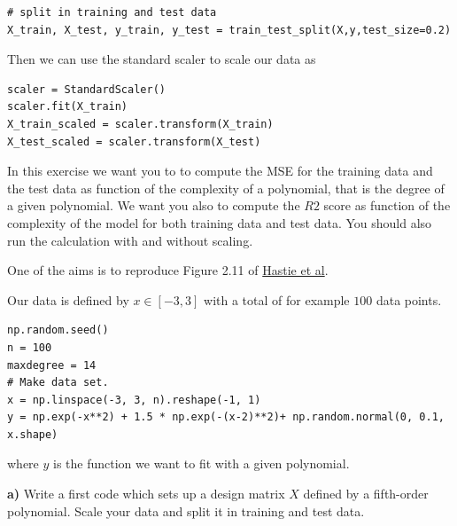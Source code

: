 \documentclass{beamer}
\newenvironment{doconceexercise}{}{}
\newcounter{doconce:movie:counter}
\newcommand{\subex}[1]{\noindent\textbf{#1}}  %
\begin{document}
\begin{frame}
\begin{doconceexercise}
\begin{verbatim}
# split in training and test data
X_train, X_test, y_train, y_test = train_test_split(X,y,test_size=0.2)

\end{verbatim}

Then we can use the standard scaler to scale our data as





\begin{verbatim}
scaler = StandardScaler()
scaler.fit(X_train)
X_train_scaled = scaler.transform(X_train)
X_test_scaled = scaler.transform(X_test)

\end{verbatim}


In this exercise we want you to to compute the MSE for the training
data and the test data as function of the complexity of a polynomial,
that is the degree of a given polynomial. We want you also to compute the $R2$ score as function of the complexity of the model for both training data and test data.  You should also run the calculation with and without scaling. 

One of 
the aims is to reproduce Figure 2.11 of \href{{https://github.com/CompPhysics/MLErasmus/blob/master/doc/Textbooks/elementsstat.pdf}}{Hastie et al}.

Our data is defined by $x\in [-3,3]$ with a total of for example $100$ data points.







\begin{verbatim}
np.random.seed()
n = 100
maxdegree = 14
# Make data set.
x = np.linspace(-3, 3, n).reshape(-1, 1)
y = np.exp(-x**2) + 1.5 * np.exp(-(x-2)**2)+ np.random.normal(0, 0.1, x.shape)

\end{verbatim}

where $y$ is the function we want to fit with a given polynomial.

\subex{a)}
Write a first code which sets up a design matrix $X$ defined by a fifth-order polynomial.  Scale your data and split it in training and test data.


\end{doconceexercise}
\end{frame}
\end{document}
